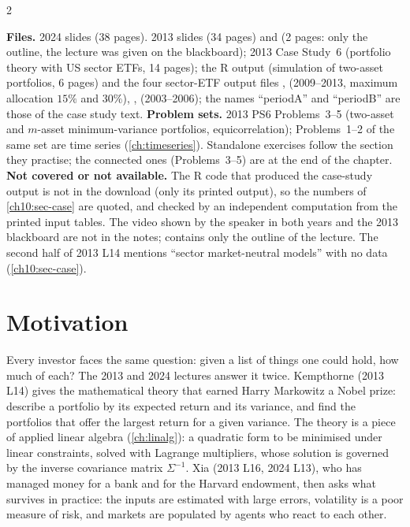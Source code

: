 \begin{paracol}{2}
\begin{sources}
\smallskip
\textbf{Files.} 2024 slides  (38 pages). 2013 slides 
(34 pages) and  (2 pages: only the outline, the lecture was given on the blackboard);
2013 Case Study~6  (portfolio theory with US sector ETFs, 14 pages); the R output
 (simulation of two-asset portfolios, 6 pages) and the four sector-ETF output files
,  (2009--2013, maximum allocation $15\%$ and $30\%$),
,  (2003--2006); the names ``periodA'' and ``periodB'' are those of
the case study text.
\textbf{Problem sets.} 2013 PS6 Problems~3--5 (two-asset and $m$-asset minimum-variance portfolios,
equicorrelation); Problems~1--2 of the same set are time series (\cref{ch:timeseries}). Standalone exercises follow the section they practise;
the connected ones (Problems~3--5) are at the end of the chapter.
\textbf{Not covered or not available.} The R code that produced the case-study output is not in the download (only
its printed output), so the numbers of \cref{ch10:sec-case} are quoted, and checked by an independent computation
from the printed input tables. The video shown by the speaker in both years and the 2013 blackboard are not in the
notes;  contains only the outline of the lecture. The second half of 2013 L14 mentions ``sector
market-neutral models'' with no data (\cref{ch10:sec-case}).
\end{sources}

\section*{Motivation}
Every investor faces the same question: given a list of things one could hold, how much of each? The 2013 and 2024
lectures answer it twice. Kempthorne (2013 L14) gives the mathematical theory that earned Harry Markowitz a Nobel
prize: describe a portfolio by its expected return and its variance, and find the portfolios that offer the
largest return for a given variance. The theory is a piece of applied linear algebra (\cref{ch:linalg}): a
quadratic form to be minimised under linear constraints, solved with Lagrange multipliers, whose solution is
governed by the inverse covariance matrix $\Sigma^{-1}$. Xia (2013 L16, 2024 L13), who has managed money for
a bank and for the Harvard endowment, then asks what survives in practice: the inputs are estimated with large
errors, volatility is a poor measure of risk, and markets are populated by agents who react to each other.


\end{paracol}
